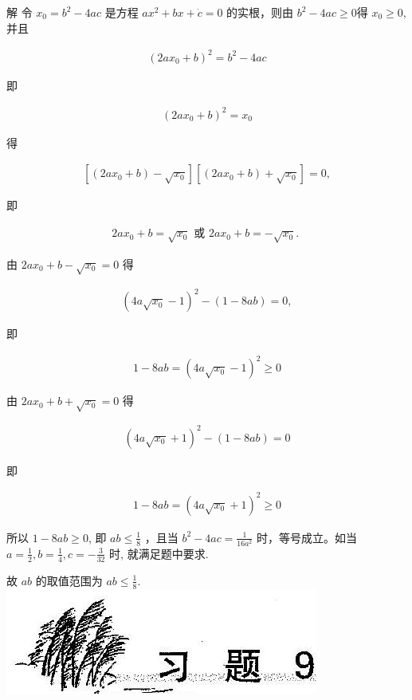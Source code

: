 \documentclass[10pt]{article}
\begin{document}
解 令 $x_{0}=b^{2}-4 a c$ 是方程 $a x^{2}+b x+\dot{c}=0$ 的实根，则由 $b^{2}-4 a c \geqslant 0$得 $x_{0} \geqslant 0$, 并且

\begin{align*}
\left(2 a x_{0}+b\right)^{2}=b^{2}-4 a c
\end{align*}

即

\begin{align*}
\left(2 a x_{0}+b\right)^{2}=x_{0}
\end{align*}

得

\begin{align*}
\left[\left(2 a x_{0}+b\right)-\sqrt{x_{0}}\right]\left[\left(2 a x_{0}+b\right)+\sqrt{x_{0}}\right]=0,
\end{align*}

即

\begin{align*}
2 a x_{0}+b=\sqrt{x_{0}} \text { 或 } 2 a x_{0}+b=-\sqrt{x_{0}} \text {. }
\end{align*}

由 $2 a x_{0}+b-\sqrt{x_{0}}=0$ 得

\begin{align*}
\left(4 a \sqrt{x_{0}}-1\right)^{2}-(1-8 a b)=0,
\end{align*}

即

\begin{align*}
1-8 a b=\left(4 a \sqrt{x_{0}}-1\right)^{2} \geqslant 0
\end{align*}

由 $2 a x_{0}+b+\sqrt{x_{0}}=0$ 得

\begin{align*}
\left(4 a \sqrt{x_{0}}+1\right)^{2}-(1-8 a b)=0
\end{align*}

即

\begin{align*}
1-8 a b=\left(4 a \sqrt{x_{0}}+1\right)^{2} \geqslant 0
\end{align*}

所以 $1-8 a b \geqslant 0$, 即 $a b \leqslant \frac{1}{8}$ ，且当 $b^{2}-4 a c=\frac{1}{16 a^{2}}$ 时，等号成立。如当 $a=\frac{1}{2}, b=\frac{1}{4}, c=-\frac{3}{32}$ 时, 就满足题中要求.

故 $a b$ 的取值范围为 $a b \leqslant \frac{1}{8}$.\\
\includegraphics[max width=\textwidth, center]{2024_10_30_26b590fd1106d28139f0g-060}
\end{document}
